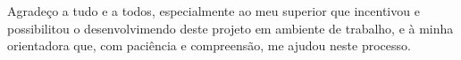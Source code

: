 \begin{agradecimentos}[AGRADECIMENTOS]

Agradeço a tudo e a todos, especialmente ao meu superior que incentivou e possibilitou o desenvolvimendo deste projeto em ambiente de trabalho, e à minha orientadora que, com paciência e compreensão, me ajudou neste processo.

\end{agradecimentos}


